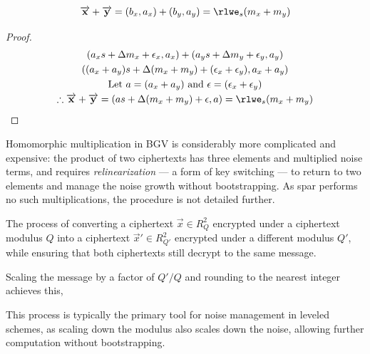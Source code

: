 \begin{definition}
    \begin{equation}
        \vec{x} + \vec{y} = (b_x, a_x) + (b_y, a_y) = \rlwe_s(m_x + m_y)
    \end{equation}
    \begin{proof}
        \begin{gather*}
            (a_x s + \Delta m_x + \epsilon_x, a_x) + (a_y s + \Delta m_y + \epsilon_y, a_y) \\
            ((a_x +a_y )s + \Delta (m_x+m_y) + (\epsilon_x + \epsilon_y), a_x + a_y) \\
            \text{Let } a = (a_x + a_y) \text{ and } \epsilon = (\epsilon_x + \epsilon_y)\\
            \therefore \vec{x} + \vec{y} = (as + \Delta(m_x + m_y) + \epsilon, a) = \rlwe_s(m_x + m_y)
        \end{gather*}
    \end{proof}
\end{definition}

Homomorphic multiplication in BGV is considerably more complicated and expensive: the product of two ciphertexts has three elements and multiplied noise terms, and requires \textit{relinearization} --- a form of key switching --- to return to two elements and manage the noise growth without bootstrapping. As \gls{spar} performs no such multiplications, the procedure is not detailed further.

\begin{definition}
    The process of converting a ciphertext $\vec{x}\in R_Q^2$ encrypted under a ciphertext modulus $Q$ into a ciphertext $\vec{x}'\in R_{Q'}^2$ encrypted under a different modulus $Q'$, while ensuring that both ciphertexts still decrypt to the same message. 
    
    Scaling the message by a factor of $Q'/Q$ and rounding to the nearest integer achieves this, 
    
    This process is typically the primary tool for noise management in leveled schemes, as scaling down the modulus also scales down the noise, allowing further computation without bootstrapping.
\end{definition}


